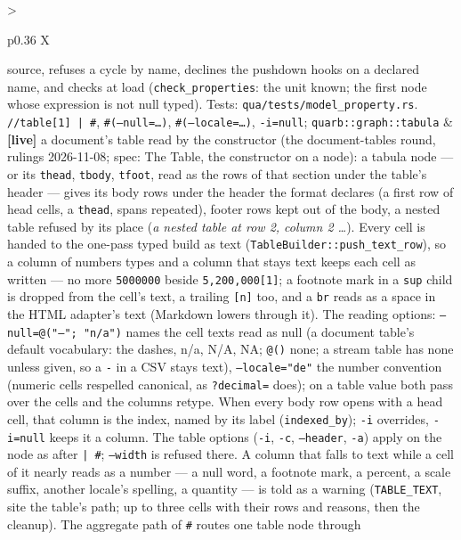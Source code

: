 \documentclass{report}
\newcommand{\live}{\textbf{\textcolor{blue!60!black}{[live]}}\xspace}
\begin{document}
\begin{xltabular}{\textwidth}{>{\raggedright\arraybackslash}p{0.36\textwidth} X}
    source, refuses a cycle by name, declines the pushdown hooks on a
    declared name, and checks at load (\texttt{check\_properties}: the
    unit known; the first node whose expression is not null typed).
    Tests: \texttt{qua/tests/model\_property.rs}. \\
\texttt{//table[1] | \#}, \texttt{\#(--null=…)}, \texttt{\#(--locale=…)}, \texttt{-i=null}; \texttt{quarb::graph::tabula}
  & \live a document's table read by the constructor (the
    document-tables round, rulings 2026-11-08; spec: The Table, the
    constructor on a node): a tabula node — or its \texttt{thead},
    \texttt{tbody}, \texttt{tfoot}, read as the rows of that section
    under the table's header — gives its body rows under the header
    the format declares (a first row of head cells, a \texttt{thead},
    spans repeated), footer rows kept out of the body, a nested table
    refused by its place (\emph{a nested table at row 2, column 2 …}).
    Every cell is handed to the one-pass typed build as text
    (\texttt{TableBuilder::push\_text\_row}), so a column of numbers
    types and a column that stays text keeps each cell as written —
    no more \texttt{5000000} beside \texttt{5,200,000[1]}; a footnote
    mark in a \texttt{sup} child is dropped from the cell's text, a
    trailing \texttt{[n]} too, and a \texttt{br} reads as a space in
    the HTML adapter's text (Markdown lowers through it). The reading
    options: \texttt{--null=@("—"; "n/a")} names the cell texts read
    as null (a document table's default vocabulary: the dashes,
    n/a, N/A, NA; \texttt{@()} none; a stream table has none unless
    given, so a \texttt{-} in a CSV stays text), \texttt{--locale="de"}
    the number convention (numeric cells respelled canonical, as
    \texttt{?decimal=} does); on a table value both pass over the
    cells and the columns retype. When every body row opens with a
    head cell, that column is the index, named by its label
    (\texttt{indexed\_by}); \texttt{-i} overrides, \texttt{-i=null}
    keeps it a column. The table options (\texttt{-i}, \texttt{-c},
    \texttt{--header}, \texttt{-a}) apply on the node as after
    \texttt{| \#}; \texttt{--width} is refused there. A column that
    falls to text while a cell of it nearly reads as a number — a
    null word, a footnote mark, a percent, a scale suffix, another
    locale's spelling, a quantity — is told as a warning
    (\texttt{TABLE\_TEXT}, site the table's path; up to three cells
    with their rows and reasons, then the cleanup). The aggregate
    path of \texttt{\#} routes one table node through

\end{xltabular}
\end{document}

